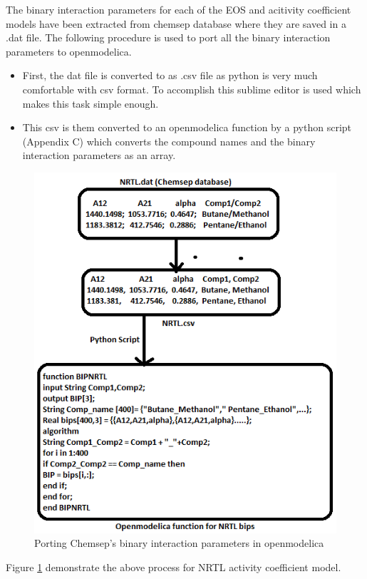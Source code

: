 \documentclass[12pt]{report}
\begin{document}
The binary interaction parameters for each of the EOS and acitivity coefficient models have been extracted from chemsep database where they are saved in a .dat file. The following procedure is used to port all the binary interaction parameters to openmodelica. 

\begin{itemize}
\item First, the dat file is converted to as .csv file as python is very much comfortable with csv format. To accomplish this sublime editor is used which makes this task simple enough.
\item This csv is them converted to an openmodelica function by a python script (Appendix C) which converts the compound names and the binary interaction parameters as an array.
\end{itemize}

\begin{figure}
\centering
\includegraphics[width=0.8\linewidth]{BT3}
\caption{Porting Chemsep's binary interaction parameters in openmodelica}
\label{fig:BT3}
\end{figure}

Figure \ref{fig:BT3} demonstrate the above process for NRTL activity coefficient model.
\end{document}
